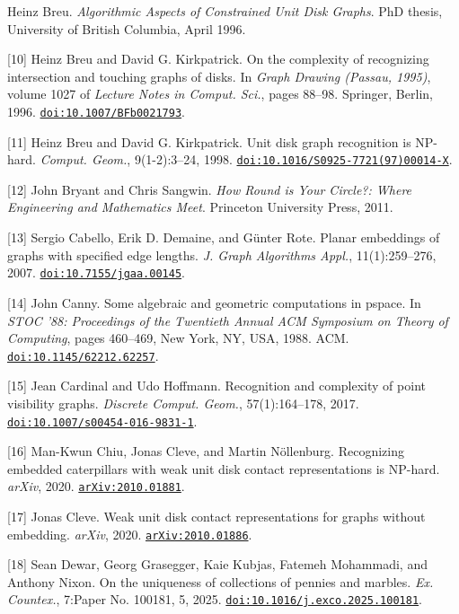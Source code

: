 \documentclass{article}
\begin{document}
\begin{hangpars}
[9] Heinz Breu. \emph{Algorithmic Aspects of Constrained Unit Disk Graphs}. PhD thesis, University of British Columbia, April 1996.

[10] Heinz Breu and David G. Kirkpatrick. On the complexity of recognizing intersection and touching graphs of disks. In \emph{Graph Drawing (Passau, 1995)}, volume 1027 of \emph{Lecture Notes in Comput. Sci.}, pages 88–98. Springer, Berlin, 1996. \href{https://doi.org/10.1007/BFb0021793}{\nolinkurl{doi:10.1007/BFb0021793}}.

[11] Heinz Breu and David G. Kirkpatrick. Unit disk graph recognition is NP-hard. \emph{Comput. Geom.}, 9(1-2):3–24, 1998. \href{https://doi.org/10.1016/S0925-7721(97)00014-X}{\nolinkurl{doi:10.1016/S0925-7721(97)00014-X}}.

[12] John Bryant and Chris Sangwin. \emph{How Round is Your Circle?: Where Engineering and Mathematics Meet}. Princeton University Press, 2011.

[13] Sergio Cabello, Erik D. Demaine, and Günter Rote. Planar embeddings of graphs with specified edge lengths. \emph{J. Graph Algorithms Appl.}, 11(1):259–276, 2007. \href{https://doi.org/10.7155/jgaa.00145}{\nolinkurl{doi:10.7155/jgaa.00145}}.

[14] John Canny. Some algebraic and geometric computations in pspace. In \emph{STOC ’88: Proceedings of the Twentieth Annual ACM Symposium on Theory of Computing}, pages 460–469, New York, NY, USA, 1988. ACM. \href{https://doi.org/10.1145/62212.62257}{\nolinkurl{doi:10.1145/62212.62257}}.

[15] Jean Cardinal and Udo Hoffmann. Recognition and complexity of point visibility graphs. \emph{Discrete Comput. Geom.}, 57(1):164–178, 2017. \href{https://doi.org/10.1007/s00454-016-9831-1}{\nolinkurl{doi:10.1007/s00454-016-9831-1}}.

[16] Man-Kwun Chiu, Jonas Cleve, and Martin Nöllenburg. Recognizing embedded caterpillars with weak unit disk contact representations is NP-hard. \emph{arXiv}, 2020. \href{https://arxiv.org/abs/2010.01881}{\nolinkurl{arXiv:2010.01881}}.

[17] Jonas Cleve. Weak unit disk contact representations for graphs without embedding. \emph{arXiv}, 2020. \href{https://arxiv.org/abs/2010.01886}{\nolinkurl{arXiv:2010.01886}}.

[18] Sean Dewar, Georg Grasegger, Kaie Kubjas, Fatemeh Mohammadi, and Anthony Nixon. On the uniqueness of collections of pennies and marbles. \emph{Ex. Countex.}, 7:Paper No. 100181, 5, 2025. \href{https://doi.org/10.1016/j.exco.2025.100181}{\nolinkurl{doi:10.1016/j.exco.2025.100181}}.


\end{hangpars}
\end{document}
